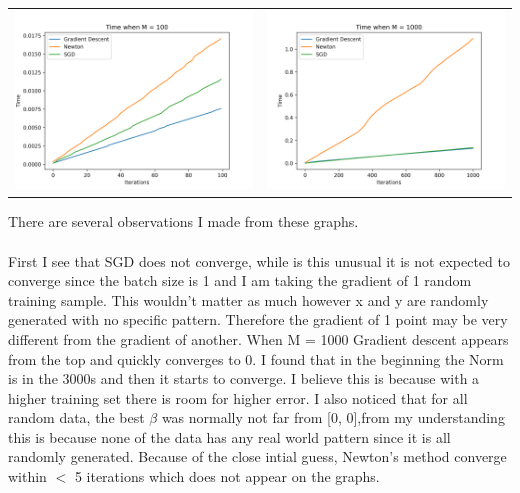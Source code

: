 \documentclass[11pt]{article}
\begin{document}
\begin{tabular}{c c}
\includegraphics[scale=.55]{time_m_100.png} & \includegraphics[scale=.55]{time_m_1000.png}
\end{tabular}

There are several observations I made from these graphs.\\\\
First I see that SGD does not converge, while is this unusual it is not expected to converge since the batch size is 1 and I am taking the gradient of 1 random training sample. This wouldn't matter as much however x and y are randomly generated with no specific pattern. Therefore the gradient of 1 point may be very different from the gradient of another. When M = 1000 Gradient descent appears from the top and quickly converges to 0. I found that in the beginning the Norm is in the 3000s and then it starts to converge. I believe this is because with a higher training set there is room for higher error. I also noticed that for all random data, the best $\beta$ was normally not far from [0, 0],from my understanding this is because none of the data has any real world pattern since it is all randomly generated. Because of the close intial guess, Newton's method converge within $<$ 5 iterations which does not appear on the graphs.  \\\\
\end{document}
